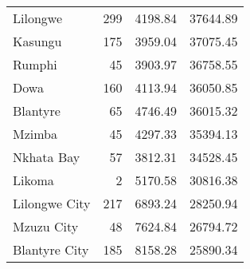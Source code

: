 \begin{tabular}{lrrr}
Lilongwe      &     299 &        4198.84 &            37644.89 \\
Kasungu       &     175 &        3959.04 &            37075.45 \\
Rumphi        &      45 &        3903.97 &            36758.55 \\
Dowa          &     160 &        4113.94 &            36050.85 \\
Blantyre      &      65 &        4746.49 &            36015.32 \\
Mzimba        &      45 &        4297.33 &            35394.13 \\
Nkhata Bay    &      57 &        3812.31 &            34528.45 \\
Likoma        &       2 &        5170.58 &            30816.38 \\
Lilongwe City &     217 &        6893.24 &            28250.94 \\
Mzuzu City    &      48 &        7624.84 &            26794.72 \\
Blantyre City &     185 &        8158.28 &            25890.34 \\
\bottomrule
\end{tabular}
